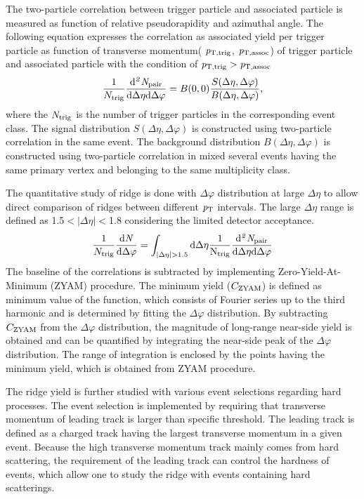 The two-particle correlation between trigger particle and associated particle is measured as function of relative pseudorapidity and azimuthal angle. The following equation expresses the correlation as associated yield per trigger particle as function of transverse momentum( $\it{p}_{\rm{T, trig}}$, $\it{p}_{\rm{T, assoc}}$) of trigger particle and associated particle with the condition of $\it{p}_{\rm{T, trig}} > \it{p}_{\rm{T, assoc}}$
\begin{eqnarray}
\frac{1}{N_{\rm{trig}}} \frac{ \rm{d}\it{}^{2} N_{\rm{pair}} }{ \rm{d} \Delta\eta \rm{d}\Delta\varphi} = B(0, 0)\frac{S(\Delta\eta, \Delta\varphi)}{B(\Delta\eta, \Delta\varphi)},
\end{eqnarray}
where the $N_{\rm{trig}}$ is the number of trigger particles in the corresponding event class. The signal distribution $S(\Delta\eta, \Delta\varphi)$ is constructed using two-particle correlation in the same event. The background distribution $B(\Delta\eta, \Delta\varphi)$ is constructed using two-particle correlation in mixed several events having the same primary vertex and belonging to the same multiplicity class.

The quantitative study of ridge is done with $\Delta\varphi$ distribution at large $\Delta\eta$ to allow direct comparison of ridges between different $\it{p}_{\rm{T}}$ intervals. The large $\Delta\eta$ range is defined as 1.5$<|\Delta\eta|<$1.8 considering the limited detector acceptance.
\begin{eqnarray}
\frac{1}{N_{\rm{trig}}} \frac{ \rm{d}\it{}N }{ \rm{d}\Delta\varphi } = \int_{|\Delta \eta|>1.5} \rm{d} \Delta \eta \frac{1}{N_{\rm{trig}}} \frac{ \rm{d}\it{}^{2} N_{\rm{pair}} }{ \rm{d}\Delta\eta \rm{d}\Delta\varphi}
\end{eqnarray}
The baseline of the correlations is subtracted by implementing Zero-Yield-At-Minimum (ZYAM) procedure. The minimum yield ($C_{\rm{ZYAM}}$) is defined as minimum value of the function, which consists of Fourier series up to the third harmonic and is determined by fitting the $\Delta\varphi$ distribution. By subtracting $C_{\rm{ZYAM}}$ from the $\Delta\varphi$ distribution, the magnitude of long-range near-side yield is obtained and can be quantified by integrating the near-side peak of the $\Delta\varphi$ distribution. The range of integration is enclosed by the points having the minimum yield, which is obtained from ZYAM procedure.

The ridge yield is further studied with various event selections regarding hard processes. The event selection is implemented by requiring that transverse momentum of leading track is larger than specific threshold. The leading track is defined as a charged track having the largest transverse momentum in a given event. Because the high transverse momentum track mainly comes from hard scattering, the requirement of the leading track can control the hardness of events, which allow one to study the ridge with events containing hard scatterings.

